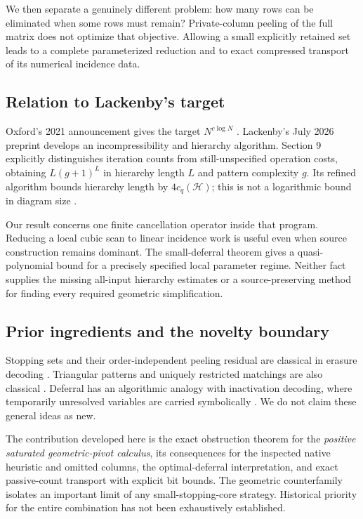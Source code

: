 \documentclass[11pt]{article}
\theoremstyle{definition}\newtheorem{definition}[theorem]{Definition}
\theoremstyle{remark}\newtheorem{remark}[theorem]{Remark}
\begin{document}
We then separate a genuinely different problem: how many rows can be eliminated when some rows must remain? Private-column peeling of the full matrix does not optimize that objective. Allowing a small explicitly retained set leads to a complete parameterized reduction and to exact compressed transport of its numerical incidence data.

\subsection{Relation to Lackenby's target}
Oxford's 2021 announcement gives the target $N^{c\log N}$ \cite{announcement}. Lackenby's July 2026 preprint develops an incompressibility and hierarchy algorithm. Section 9 explicitly distinguishes iteration counts from still-unspecified operation costs, obtaining $L(g+1)^L$ in hierarchy length $L$ and pattern complexity $g$. Its refined algorithm bounds hierarchy length by $4c_q(\mathcal H)$; this is not a logarithmic bound in diagram size \cite{lackenby2026}.

Our result concerns one finite cancellation operator inside that program. Reducing a local cubic scan to linear incidence work is useful even when source construction remains dominant. The small-deferral theorem gives a quasi-polynomial bound for a precisely specified local parameter regime. Neither fact supplies the missing all-input hierarchy estimates or a source-preserving method for finding every required geometric simplification.

\subsection{Prior ingredients and the novelty boundary}
Stopping sets and their order-independent peeling residual are classical in erasure decoding \cite{di}. Triangular patterns and uniquely restricted matchings are also classical \cite{chapman}. Deferral has an algorithmic analogy with inactivation decoding, where temporarily unresolved variables are carried symbolically \cite{inactivation}. We do not claim these general ideas as new.

The contribution developed here is the exact obstruction theorem for the \emph{positive saturated geometric-pivot calculus}, its consequences for the inspected native heuristic and omitted columns, the optimal-deferral interpretation, and exact passive-count transport with explicit bit bounds. The geometric counterfamily isolates an important limit of any small-stopping-core strategy. Historical priority for the entire combination has not been exhaustively established.
\end{document}
